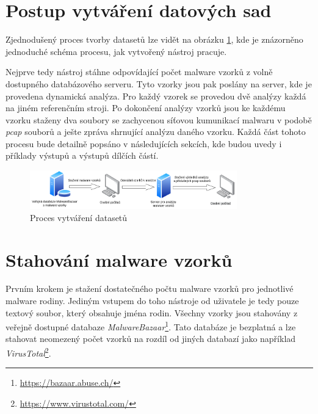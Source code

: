 
\section{Postup vytváření datových sad}
Zjednodušený proces tvorby datasetů lze vidět na obrázku \ref{pipeline}, kde je znázorněno jednoduché schéma procesu, jak vytvořený nástroj pracuje. 

Nejprve tedy nástroj stáhne odpovídající počet malware vzorků z volně dostupného databázového serveru. Tyto vzorky jsou pak poslány na server, kde je provedena dynamická analýza.
Pro každý vzorek se provedou dvě analýzy každá na jiném referenčním stroji.
Po dokončení analýzy vzorků jsou ke každému vzorku staženy dva soubory se zachycenou síťovou kumunikací malwaru v podobě \textit{pcap} souborů a ješte zpráva shrnující analýzu daného vzorku.
Každá část tohoto procesu bude detailně popsáno v následujících sekcích, kde budou uvedy i příklady výstupů a výstupů dílčích částí.\\

\begin{figure}[h]
	\centering
        \includegraphics[width=0.8\textwidth]{obrazky/pipeline.png}
	\caption{Proces vytváření datasetů}
    \label{pipeline}
\end{figure}

\section{Stahování malware vzorků}
Prvním krokem je stažení dostatečného počtu malware vzorků pro jednotlivé malware rodiny. Jediným vstupem do toho nástroje od uživatele je tedy pouze textový soubor, který obsahuje
jména rodin. Všechny vzorky jsou stahovány z veřejně dostupné databaze \textit{MalwareBazaar}\footnote{\href{https://bazaar.abuse.ch/}{https://bazaar.abuse.ch/}}. Tato databáze je 
bezplatná a lze stahovat neomezený počet vzorků na rozdíl od jiných databazí jako například \textit{VirusTotal}\footnote{\href{https://www.virustotal.com/gui/home/upload}{https://www.virustotal.com/}}.


